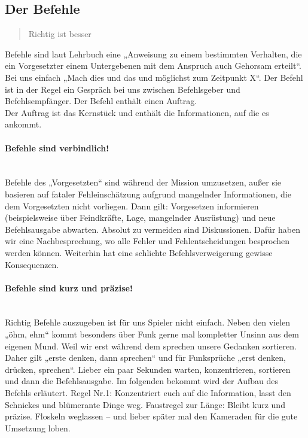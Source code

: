 \subsection{Der Befehle}
\begin{quote}
	\glqq Richtig ist besser\grqq
\end{quote}
Befehle sind laut Lehrbuch eine „Anweisung zu einem bestimmten Verhalten, die ein Vorgesetzter einem Untergebenen mit dem Anspruch auch Gehorsam erteilt“. Bei uns einfach „Mach dies und das und möglichst zum Zeitpunkt X“. Der Befehl ist in der Regel ein Gespräch bei uns zwischen Befehlsgeber und Befehlsempfänger. Der Befehl enthält einen Auftrag.\\
Der Auftrag ist das Kernstück und enthält die Informationen, auf die es ankommt.

\paragraph*{Befehle sind verbindlich!}\ \\
Befehle des „Vorgesetzten“ sind während der Mission umzusetzen, außer sie basieren auf fataler Fehleinschätzung aufgrund mangelnder Informationen, die dem Vorgesetzten nicht vorliegen. Dann gilt: Vorgesetzen informieren (beispielsweise über Feindkräfte, Lage, mangelnder Ausrüstung) und neue Befehlsausgabe abwarten. Absolut zu vermeiden sind Diskussionen. Dafür haben wir eine Nachbesprechung, wo alle Fehler und Fehlentscheidungen besprochen werden können. Weiterhin hat eine schlichte Befehlsverweigerung gewisse Konsequenzen.\\

\paragraph*{Befehle sind kurz und präzise!}\ \\
Richtig Befehle auszugeben ist für uns Spieler nicht einfach. 
Neben den vielen „öhm, ehm“ kommt besonders über Funk gerne mal kompletter Unsinn aus dem eigenen Mund. 
Weil wir erst während dem sprechen unsere Gedanken sortieren. 
Daher gilt „erste denken, dann sprechen“ und für Funksprüche „erst denken, drücken, sprechen“. Lieber ein paar Sekunden warten, konzentrieren, sortieren und dann die Befehlsausgabe.
Im folgenden bekommt wird der Aufbau des Befehls erläutert. Regel Nr.1: Konzentriert euch auf die Information, lasst den Schnickes und blümerante Dinge weg.
Faustregel zur Länge: Bleibt kurz und präzise. Floskeln weglassen – und lieber später mal den Kameraden für die gute Umsetzung loben. 


